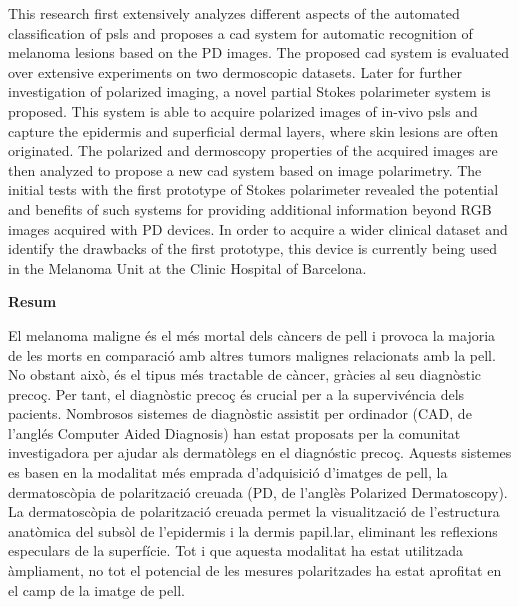 This research first extensively analyzes different aspects of the automated classification of \ac{psls} and proposes a \ac{cad} system for automatic recognition of melanoma lesions based on the PD images.
The proposed \ac{cad} system is evaluated over extensive experiments on two dermoscopic datasets.
Later for further investigation of polarized imaging, a novel partial Stokes polarimeter system is proposed.
This system is able to acquire polarized images of in-vivo \ac{psls} and capture the epidermis and superficial dermal layers, where skin lesions are often originated.
The polarized and dermoscopy properties of the acquired images are then analyzed to propose a new \ac{cad} system based on image polarimetry.
The initial tests with the first prototype of Stokes polarimeter revealed the potential and benefits of such systems for providing additional information beyond RGB images acquired with PD devices.
In order to acquire a wider clinical dataset and identify the drawbacks of the first prototype, this device is currently being used in the Melanoma Unit at the Clinic Hospital of Barcelona.
\clearpage


\begin{center}\textbf{Resum}\\\end{center}
El melanoma maligne \'es el m\'es mortal dels c\`ancers de pell i provoca la majoria de les morts en comparaci\'o amb altres tumors malignes relacionats amb la pell.
No obstant aix\`o, \'es el tipus m\'es tractable de c\`ancer, gr\`acies al seu diagn\`ostic preco\c{c}.
Per tant, el diagn\`ostic preco\c{c} \'es crucial per a la superviv\'encia dels pacients.
Nombrosos sistemes de diagn\`ostic assistit per ordinador (CAD, de l'angl\'es Computer Aided Diagnosis) han estat proposats per la comunitat investigadora per ajudar als dermat\`olegs en el diagn\'ostic preco\c{c}.
Aquests sistemes es basen en la modalitat m\'es emprada d'adquisici\'o d'imatges de pell, la dermatosc\`opia de polaritzaci\'o creuada (PD, de l'angl\`es Polarized Dermatoscopy).
La dermatosc\`opia de polaritzaci\'o creuada permet la visualitzaci\'o de l'estructura anat\`omica del subs\`ol de l'epidermis i la dermis papil.lar, eliminant les reflexions especulars de la superf\'icie. Tot i que aquesta modalitat ha estat utilitzada \`ampliament, no tot el potencial de les mesures polaritzades ha estat aprofitat en el camp de la imatge de pell.

